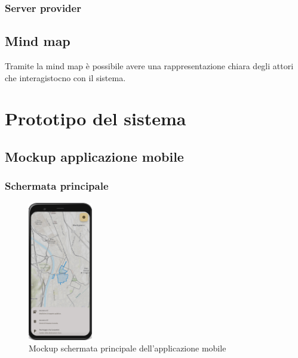 \documentclass{article}
\begin{document}
\subsubsection{Server provider}

\clearpage

\subsection{Mind map}


Tramite la mind map è possibile avere una rappresentazione chiara degli attori che interagistocno con il sistema.\\
\clearpage

\section{Prototipo del sistema}

\subsection{Mockup applicazione mobile}

\subsubsection{Schermata principale}
\begin{figure}[htbp]
    \label{fig:Schermata_principale_mobile}
    \centering
    \includegraphics[width=0.25\textwidth]{Images/Mockup1 - Mobile.png}
    \caption{Mockup schermata principale dell'applicazione mobile}
\end{figure}
\end{document}
